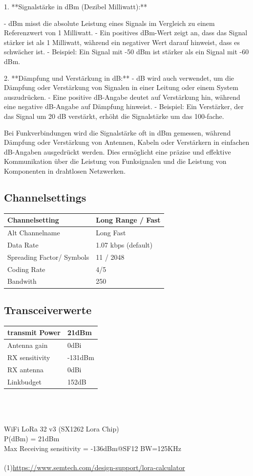 \documentclass[12pt,a4paper]{article}
\begin{document}
1. **Signalstärke in dBm (Dezibel Milliwatt):**

   - dBm misst die absolute Leistung eines Signals im Vergleich zu einem Referenzwert von 1 Milliwatt.
   - Ein positives dBm-Wert zeigt an, dass das Signal stärker ist als 1 Milliwatt, während ein negativer Wert darauf hinweist, dass es schwächer ist.
   - Beispiel: Ein Signal mit -50 dBm ist stärker als ein Signal mit -60 dBm.

2. **Dämpfung und Verstärkung in dB:**
   - dB wird auch verwendet, um die Dämpfung oder Verstärkung von Signalen in einer Leitung oder einem System auszudrücken.
   - Eine positive dB-Angabe deutet auf Verstärkung hin, während eine negative dB-Angabe auf Dämpfung hinweist.
   - Beispiel: Ein Verstärker, der das Signal um 20 dB verstärkt, erhöht die Signalstärke um das 100-fache.

Bei Funkverbindungen wird die Signalstärke oft in dBm gemessen, während Dämpfung oder Verstärkung von Antennen, Kabeln oder Verstärkern in einfachen dB-Angaben ausgedrückt werden. Dies ermöglicht eine präzise und effektive Kommunikation über die Leistung von Funksignalen und die Leistung von Komponenten in drahtlosen Netzwerken.

\subsection{Channelsettings}
\begin{tabular}[h]{l | l}
Channelsetting  & Long Range / Fast \\
\hline
Alt Channelname & Long Fast \\
\hline
Data Rate & 1.07 kbps (default)\\
\hline
Spreading Factor/ Symbols & 11 / 2048 \\
\hline
Coding Rate & 4/5 \\
\hline
Bandwith & 250
\end{tabular}

\subsection{Transceiverwerte}

\begin{tabular}[h]{l | l}
transmit Power  & 21dBm \\
\hline
Antenna gain & 0dBi \\
\hline
RX sensitivity & -131dBm\\
\hline
RX antenna & 0dBi \\
\hline
Linkbudget & 152dB \\
\end{tabular} \\ \\ \\
WiFi LoRa 32 v3 (SX1262 Lora Chip)\\
P(dBm) = 21dBm\\
Max Receiving sensitivity = -136dBm@SF12 BW=125KHz\\
\\
(1)\url{https://www.semtech.com/design-support/lora-calculator}
\end{document}
